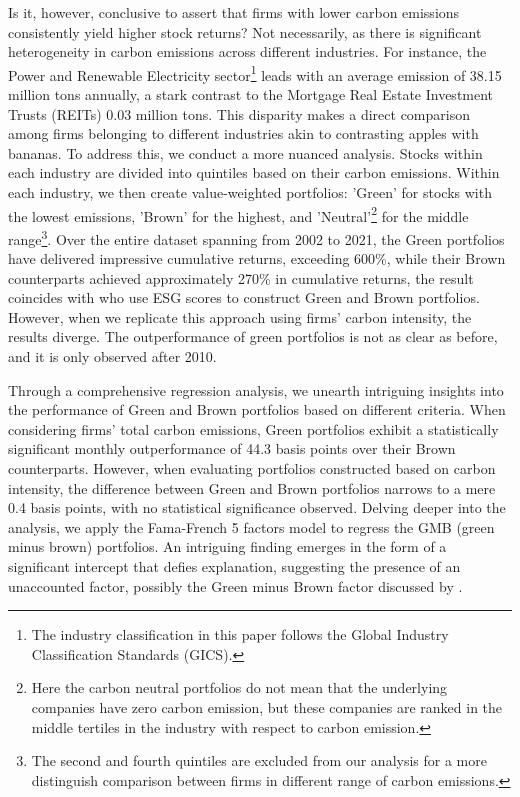 \documentclass[12pt]{article}
\begin{document}
Is it, however, conclusive to assert that firms with lower carbon emissions consistently yield higher stock returns? Not necessarily, as there is significant heterogeneity in carbon emissions across different industries. For instance, the Power and Renewable Electricity sector\footnote{The industry classification in this paper follows the Global Industry Classification Standards (GICS).} leads with an average emission of 38.15 million tons annually, a stark contrast to the Mortgage Real Estate Investment Trusts (REITs) 0.03 million tons. This disparity makes a direct comparison among firms belonging to different industries akin to contrasting apples with bananas. To address this, we conduct a more nuanced analysis. Stocks within each industry are divided into quintiles based on their carbon emissions. Within each industry, we then create value-weighted portfolios: 'Green' for stocks with the lowest emissions, 'Brown' for the highest, and 'Neutral'\footnote{Here the carbon neutral portfolios do not mean that the underlying companies have zero carbon emission, but these companies are ranked in the middle tertiles in the industry with respect to carbon emission.} for the middle range\footnote{The second and fourth quintiles are excluded from our analysis for a more distinguish comparison between firms in different range of carbon emissions.}. Over the entire dataset spanning from 2002 to 2021, the Green portfolios have delivered impressive cumulative returns, exceeding 600\%, while their Brown counterparts achieved approximately 270\% in cumulative returns, the result coincides with \cite{pastor2022dissecting} who use ESG scores to construct Green and Brown portfolios. However, when we replicate this approach using firms' carbon intensity, the results diverge. The outperformance of green portfolios is not as clear as before, and it is only observed after 2010.

Through a comprehensive regression analysis, we unearth intriguing insights into the performance of Green and Brown portfolios based on different criteria. When considering firms' total carbon emissions, Green portfolios exhibit a statistically significant monthly outperformance of 44.3 basis points over their Brown counterparts. However, when evaluating portfolios constructed based on carbon intensity, the difference between Green and Brown portfolios narrows to a mere 0.4 basis points, with no statistical significance observed. Delving deeper into the analysis, we apply the Fama-French 5 factors model to regress the GMB (green minus brown) portfolios. An intriguing finding emerges in the form of a significant intercept that defies explanation, suggesting the presence of an unaccounted factor, possibly the Green minus Brown factor discussed by \cite{pastor2022dissecting}. 
\end{document}
